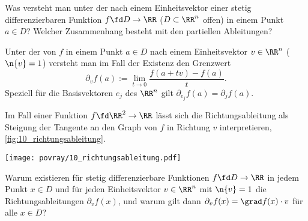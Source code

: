 \begin{frage}
  Was versteht man unter der  nach einem 
  Einheitsvektor einer stetig differenzierbaren Funktion $f\fd D \to \RR$ 
  ($D\subset \RR^n$ offen) in einem Punkt $a\in D$? Welcher Zusammenhang 
  besteht mit den partiellen Ableitungen?
\end{frage}

\begin{antwort}
  Unter der  von $f$ in einem Punkt $a\in D$ 
  nach einem Einheitsvektor $v\in \RR^n$ ({\dasheisst} $\n{v}=1$) versteht man 
  im Fall der Existenz den Grenzwert 
  \[
  \partial_v f(a) := \lim_{t\to 0 } \frac{f(a+tv)-f(a)}{t}.
  \]  
  Speziell für die Basisvektoren $e_j$ des $\RR^n$ 
  gilt $\partial_{e_j} f(a) = \partial_j f(a)$. 

  Im Fall einer Funktion $f\fd \RR^2 \to\RR$ lässt sich die Richtungsableitung 
  als Steigung der Tangente an den Graph von $f$ in Richtung $v$ interpretieren, 
  \sieheAbbildung\ref{fig:10_richtungsableitung}. \AntEnd

  \begin{center}
    \texttt{[image: povray/10\_richtungsableitung.pdf]}
    \label{fig:10_richtungsableitung}
  \end{center}

\end{antwort} 



\begin{frage}
  Warum existieren für stetig differenzierbare Funktionen $f\fd D\to \RR$ 
  in jedem Punkt $x\in D$ und für jeden Einheitsvektor 
  $v\in \RR^n$ mit $\n{v}=1$ die Richtungsableitungen 
  $\partial_v f(x)$, und warum gilt dann 
  $\partial_v f(x) = \grad f(x) \cdot v$ für alle $x\in D$?
\end{frage}

